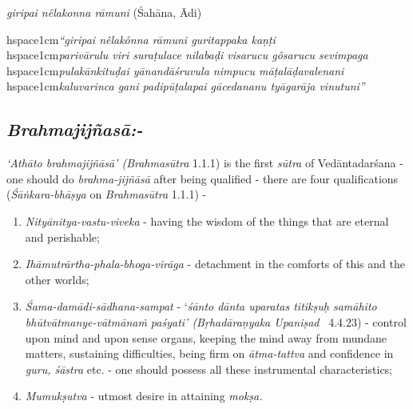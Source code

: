 \textit{giripai nêlakonna rāmuni} (Śahāna, Ādi)

\begin{myquote}
hspace{1cm}\textit{“giripai nêlakônna rāmuni guritappaka kaṇṭi} \\hspace{1cm}\textit{parivārulu viri suraṭulace nilabaḍi visarucu gôsarucu sevimpaga}\\hspace{1cm}\textit{pulakānkituḍai yānandāśruvula nimpucu māṭalāḍavalenani}\\hspace{1cm}\textit{kaluvarinca gani padipūṭalapai gācedananu tyāgarāja vinutuni”}
\end{myquote}


\subsection*{\textit{Brahmajijñasā:-}}

\textit{‘Athāto brahmajijñāsā' (Brahmasūtra} 1.1.1) is the first \textit{sūtra} of Vedāntadarśana - one should do \textit{brahma-jijñāsā} after being qualified - there are four qualifications (\textit{Śāṅkara-bhāṣya} on \textit{Brahmasūtra} 1.1.1) -

\vspace{-.3cm}

\begin{enumerate}
\itemsep=0pt
\item \textit{Nityānitya-vastu-viveka} - having the wisdom of the things that are eternal and perishable;

 \item \textit{Ihāmutrārtha-phala-bhoga-virāga} - detachment in the comforts of this and the other worlds;

 \item \textit{Śama-damādi-sādhana-sampat} - ‘\textit{śānto dānta uparatas titikṣuḥ samāhito bhūtvātmanye-vātmānaṁ paśyati’ (Bṛhadāraṇyaka Upaniṣad}  4.4.23) - control upon mind and upon sense organs, keeping the mind away from mundane matters, sustaining difficulties, being firm on \textit{ātma-tattva} and confidence in \textit{guru, śāstra} etc. - one should possess all these instrumental characteristics;

 \item \textit{Mumukṣutva} - utmost desire in attaining \textit{mokṣa.}

\end{enumerate}

